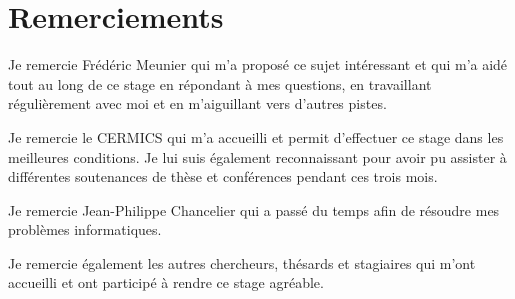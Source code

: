 \chapter*{Remerciements}

Je remercie Frédéric Meunier qui m'a proposé ce sujet intéressant et qui m'a aidé tout au long de ce stage en répondant à mes questions, en travaillant régulièrement avec moi et en m'aiguillant vers d'autres pistes.

Je remercie le CERMICS qui m'a accueilli et permit d'effectuer ce stage dans les meilleures conditions. Je lui suis également reconnaissant pour avoir pu assister à différentes soutenances de thèse et conférences pendant ces trois mois.

Je remercie Jean-Philippe Chancelier qui a passé du temps afin de résoudre mes problèmes informatiques.

Je remercie également les autres chercheurs, thésards et stagiaires qui m'ont accueilli et ont participé à rendre ce stage agréable.